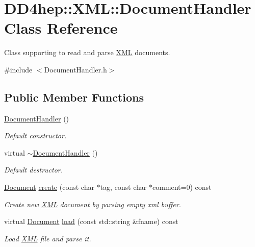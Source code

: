 \hypertarget{class_d_d4hep_1_1_x_m_l_1_1_document_handler}{
\section{DD4hep::XML::DocumentHandler Class Reference}
\label{class_d_d4hep_1_1_x_m_l_1_1_document_handler}
}


Class supporting to read and parse \hyperlink{namespace_d_d4hep_1_1_x_m_l}{XML} documents.  


{\ttfamily \#include $<$DocumentHandler.h$>$}\subsection*{Public Member Functions}
\begin{DoxyCompactItemize}
\item 
\hyperlink{class_d_d4hep_1_1_x_m_l_1_1_document_handler_ac24bb98e06d7db2b0823816eec2f6c19}{DocumentHandler} ()
\begin{DoxyCompactList}\small\item\em Default constructor. \item\end{DoxyCompactList}\item 
virtual \hyperlink{class_d_d4hep_1_1_x_m_l_1_1_document_handler_ac4952ef609acf7234615d2db783ca5fa}{$\sim$DocumentHandler} ()
\begin{DoxyCompactList}\small\item\em Default destructor. \item\end{DoxyCompactList}\item 
\hyperlink{class_d_d4hep_1_1_x_m_l_1_1_document}{Document} \hyperlink{class_d_d4hep_1_1_x_m_l_1_1_document_handler_a35782236b2fdfaf3f6f7ed304efa4c21}{create} (const char $\ast$tag, const char $\ast$comment=0) const 
\begin{DoxyCompactList}\small\item\em Create new \hyperlink{namespace_d_d4hep_1_1_x_m_l}{XML} document by parsing empty xml buffer. \item\end{DoxyCompactList}\item 
virtual \hyperlink{class_d_d4hep_1_1_x_m_l_1_1_document}{Document} \hyperlink{class_d_d4hep_1_1_x_m_l_1_1_document_handler_afb778f4cf8500ce879b0f4a0c8009be1}{load} (const std::string \&fname) const 
\begin{DoxyCompactList}\small\item\em Load \hyperlink{namespace_d_d4hep_1_1_x_m_l}{XML} file and parse it. \item\end{DoxyCompactList}\item 

\end{DoxyCompactItemize}
